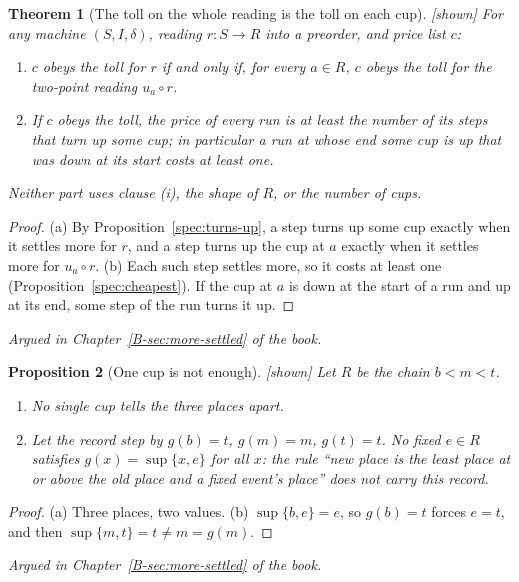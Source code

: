 \documentclass[11pt, a4paper]{article}
\theoremstyle{plain}
\newtheorem{theorem}{Theorem}[section]
\newtheorem{proposition}[theorem]{Proposition}
\theoremstyle{definition}
\theoremstyle{remark}
\newcommand{\step}{\delta}
\newcommand{\cost}{c}
\newcommand{\rd}{r}
\newcommand{\argued}[1]{\par\noindent\textit{Argued in Chapter~\ref{B-#1} of the book.}\par}
\newcommand{\kind}[1]{\textup{[#1]}}
\begin{document}
\begin{theorem}[The toll on the whole reading is the toll on each cup]\label{spec:toll-cups}
\kind{shown}
For any machine $(S,I,\step)$, reading $\rd:S\to R$ into a preorder, and price list $\cost$:
\begin{enumerate}[label=(\alph*)]
\item $\cost$ obeys the toll for $\rd$ if and only if, for every $a\in R$, $\cost$ obeys the toll for the
two-point reading $u_a\circ\rd$.
\item If $\cost$ obeys the toll, the price of every run is at least the number of its steps that turn up
some cup; in particular a run at whose end some cup is up that was down at its start costs at least
one.
\end{enumerate}
Neither part uses clause (i), the shape of $R$, or the number of cups.
\end{theorem}

\begin{proof}
(a) By Proposition~\ref{spec:turns-up}, a step turns up some cup exactly when it settles more for
$\rd$, and a step turns up the cup at $a$ exactly when it settles more for $u_a\circ\rd$. (b) Each such
step settles more, so it costs at least one (Proposition~\ref{spec:cheapest}). If the cup at $a$ is down
at the start of a run and up at its end, some step of the run turns it up.
\end{proof}

\argued{sec:more-settled}

\begin{proposition}[One cup is not enough]\label{spec:one-cup} \kind{shown}
Let $R$ be the chain $b<m<t$.
\begin{enumerate}[label=(\alph*)]
\item No single cup tells the three places apart.
\item Let the record step by $g(b)=t$, $g(m)=m$, $g(t)=t$. No fixed $e\in R$ satisfies
$g(x)=\sup\{x,e\}$ for all $x$: the rule ``new place is the least place at or above the old place and
a fixed event's place'' does not carry this record.
\end{enumerate}
\end{proposition}

\begin{proof}
(a) Three places, two values. (b) $\sup\{b,e\}=e$, so $g(b)=t$ forces $e=t$, and then
$\sup\{m,t\}=t\ne m=g(m)$.
\end{proof}

\argued{sec:more-settled}
\end{document}
